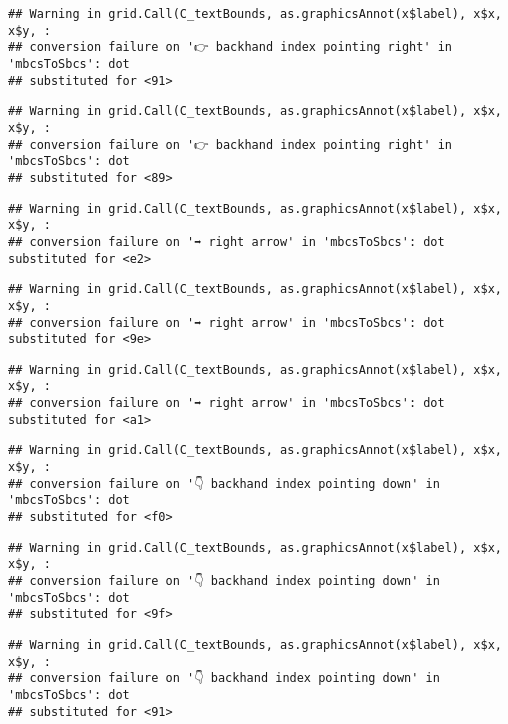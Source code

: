 \documentclass[
]{article}
\begin{document}
\begin{verbatim}
## Warning in grid.Call(C_textBounds, as.graphicsAnnot(x$label), x$x, x$y, :
## conversion failure on '👉 backhand index pointing right' in 'mbcsToSbcs': dot
## substituted for <91>
\end{verbatim}

\begin{verbatim}
## Warning in grid.Call(C_textBounds, as.graphicsAnnot(x$label), x$x, x$y, :
## conversion failure on '👉 backhand index pointing right' in 'mbcsToSbcs': dot
## substituted for <89>
\end{verbatim}

\begin{verbatim}
## Warning in grid.Call(C_textBounds, as.graphicsAnnot(x$label), x$x, x$y, :
## conversion failure on '➡ right arrow' in 'mbcsToSbcs': dot substituted for <e2>
\end{verbatim}

\begin{verbatim}
## Warning in grid.Call(C_textBounds, as.graphicsAnnot(x$label), x$x, x$y, :
## conversion failure on '➡ right arrow' in 'mbcsToSbcs': dot substituted for <9e>
\end{verbatim}

\begin{verbatim}
## Warning in grid.Call(C_textBounds, as.graphicsAnnot(x$label), x$x, x$y, :
## conversion failure on '➡ right arrow' in 'mbcsToSbcs': dot substituted for <a1>
\end{verbatim}

\begin{verbatim}
## Warning in grid.Call(C_textBounds, as.graphicsAnnot(x$label), x$x, x$y, :
## conversion failure on '👇 backhand index pointing down' in 'mbcsToSbcs': dot
## substituted for <f0>
\end{verbatim}

\begin{verbatim}
## Warning in grid.Call(C_textBounds, as.graphicsAnnot(x$label), x$x, x$y, :
## conversion failure on '👇 backhand index pointing down' in 'mbcsToSbcs': dot
## substituted for <9f>
\end{verbatim}

\begin{verbatim}
## Warning in grid.Call(C_textBounds, as.graphicsAnnot(x$label), x$x, x$y, :
## conversion failure on '👇 backhand index pointing down' in 'mbcsToSbcs': dot
## substituted for <91>
\end{verbatim}
\end{document}
